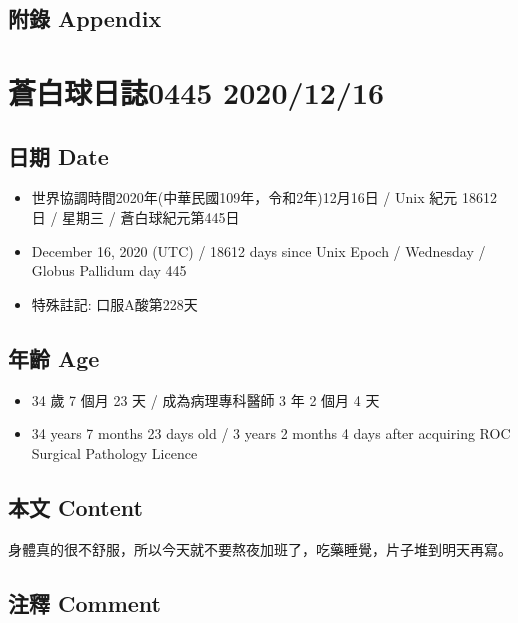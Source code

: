 \documentclass[
]{article}
\providecommand{\tightlist}{%
  \setlength{\itemsep}{0pt}\setlength{\parskip}{0pt}}
\begin{document}
\hypertarget{ux9644ux9304-appendix-14}{%
\subsection{附錄 Appendix}\label{ux9644ux9304-appendix-14}}

\hypertarget{ux84bcux767dux7403ux65e5ux8a8c0445-20201216}{%
\section{蒼白球日誌0445
2020/12/16}\label{ux84bcux767dux7403ux65e5ux8a8c0445-20201216}}

\hypertarget{ux65e5ux671f-date-15}{%
\subsection{日期 Date}\label{ux65e5ux671f-date-15}}

\begin{itemize}
\tightlist
\item
  世界協調時間2020年(中華民國109年，令和2年)12月16日 / Unix 紀元 18612
  日 / 星期三 / 蒼白球紀元第445日
\item
  December 16, 2020 (UTC) / 18612 days since Unix Epoch / Wednesday /
  Globus Pallidum day 445
\item
  特殊註記: 口服A酸第228天
\end{itemize}

\hypertarget{ux5e74ux9f61-age-15}{%
\subsection{年齡 Age}\label{ux5e74ux9f61-age-15}}

\begin{itemize}
\tightlist
\item
  34 歲 7 個月 23 天 / 成為病理專科醫師 3 年 2 個月 4 天
\item
  34 years 7 months 23 days old / 3 years 2 months 4 days after
  acquiring ROC Surgical Pathology Licence
\end{itemize}

\hypertarget{ux672cux6587-content-15}{%
\subsection{本文 Content}\label{ux672cux6587-content-15}}

身體真的很不舒服，所以今天就不要熬夜加班了，吃藥睡覺，片子堆到明天再寫。

\hypertarget{ux6ce8ux91cb-comment-15}{%
\subsection{注釋 Comment}\label{ux6ce8ux91cb-comment-15}}
\end{document}
